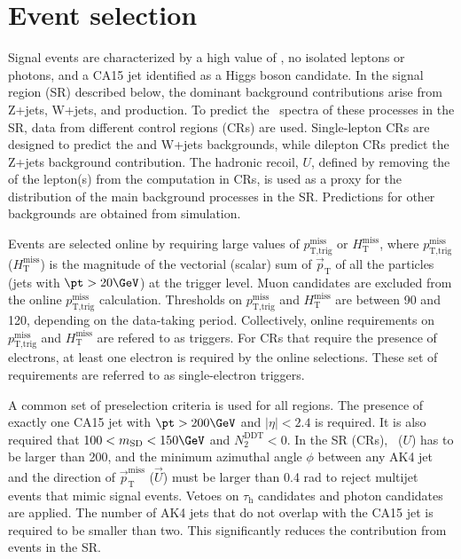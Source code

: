 \section{Event selection}


Signal events are characterized by a high value of \MET, no isolated leptons or photons, and a CA15 jet identified as a Higgs boson candidate. In the signal region (SR) described
below, the dominant background contributions arise from Z+jets,
W+jets, and \ttbar production. To predict the \ptmiss~spectra of these
processes in the SR, data from different control regions (CRs) are used. Single-lepton CRs are designed to predict the \ttbar and W+jets backgrounds, while dilepton CRs predict the Z+jets background contribution. The hadronic recoil, $U$, defined by removing the \pt of the lepton(s) from the \MET computation in CRs, is used as a proxy for the \MET distribution of the main background processes in the SR. Predictions for other backgrounds are obtained from simulation.

Events are selected online by requiring large values of $p_\text{T,trig}^\text{miss}$ or $H_{\text{T}}^{\text{miss}}$, where $p_\text{T,trig}^\text{miss}$  ($H_{\text{T}}^{\text{miss}}$) is the magnitude of the vectorial (scalar) sum of $\vec{p}_\text{T}$ of all the particles (jets with $\pt>20\GeV$) at the trigger level. Muon candidates are excluded from the online $p_\text{T,trig}^\text{miss}$ calculation.
Thresholds on $p_\text{T,trig}^\text{miss}$ and $H_{\text{T}}^{\text{miss}}$ are between 90 and 120\GeV, depending on the data-taking period. Collectively, online requirements on $p_\text{T,trig}^\text{miss}$ and $H_{\text{T}}^{\text{miss}}$ are refered to as \MET triggers.
For CRs that require the presence of electrons, at least one electron is required by the online selections. These set of requirements are referred to as single-electron triggers.

A common set of preselection criteria is used for all regions. The presence of exactly one CA15 jet with $\pt>200\GeV$ and $|\eta|<2.4$ is required. It is also required that $100<m_{\text{SD}}<150\GeV$ and $N_2^{\text{DDT}}<0$. 
 In the SR (CRs), \ptmiss~($U$) has to be larger than 200\GeV, and the minimum azimuthal angle $\phi$ between any AK4 jet and the direction of $\vec{p}_{\mathrm{T}}^{\mathrm{miss}}$ ($\vec{U}$) must be larger than 0.4 rad to reject multijet events that mimic signal events. Vetoes on $\tau_\text{h}$ candidates and photon candidates are applied. The number of AK4 jets that do not overlap with the CA15 jet is required to be smaller than two. This significantly reduces the contribution from \ttbar events in the SR.

